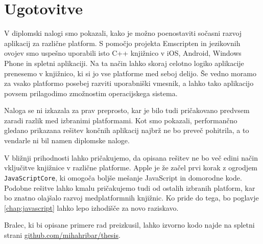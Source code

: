 








\chapter{Ugotovitve}
\label{chap:conclusion}

V diplomski nalogi smo pokazali, kako je možno poenostaviti sočasni razvoj aplikacij za različne platform. S pomočjo projekta Emscripten in jezikovnih ovojev smo uspešno uporabili isto C++ knjižnico v iOS, Android, Windows Phone in spletni aplikaciji. Na ta način lahko skoraj celotno logiko aplikacije prenesemo v knjižnico, ki si jo vse platforme med seboj delijo. Še vedno moramo za vsako platformo posebej razviti uporabniški vmesnik, a lahko tako aplikacijo povsem prilagodimo zmožnostim operacijskega sistema.

Naloga se ni izkazala za prav preprosto, kar je bilo tudi pričakovano predvsem zaradi razlik med izbranimi platformami. Kot smo pokazali, performančno gledano prikazana rešitev končnih aplikacij najbrž ne bo preveč pohitrila, a to vendarle ni bil namen diplomske naloge.

V bližnji prihodnosti lahko pričakujemo, da opisana rešitev ne bo več edini način vključitve knjižnice v različne platforme. Apple je že začel prvi korak z ogrodjem \texttt{JavaScriptCore}, ki omogoča boljše mešanje JavaScript in domorodne kode. Podobne rešitve lahko kmalu pričakujemo tudi od ostalih izbranih platform, kar bo znatno olajšalo razvoj medplatformnih knjižnic. Ko pride do tega, bo poglavje \ref{chap:javascript} lahko lepo izhodišče za novo raziskavo.

Bralec, ki bi opisane primere rad preizkusil, lahko izvorno kodo najde na spletni strani \href{https://github.com/mihahribar/thesis}{github.com/mihahribar/thesis}.